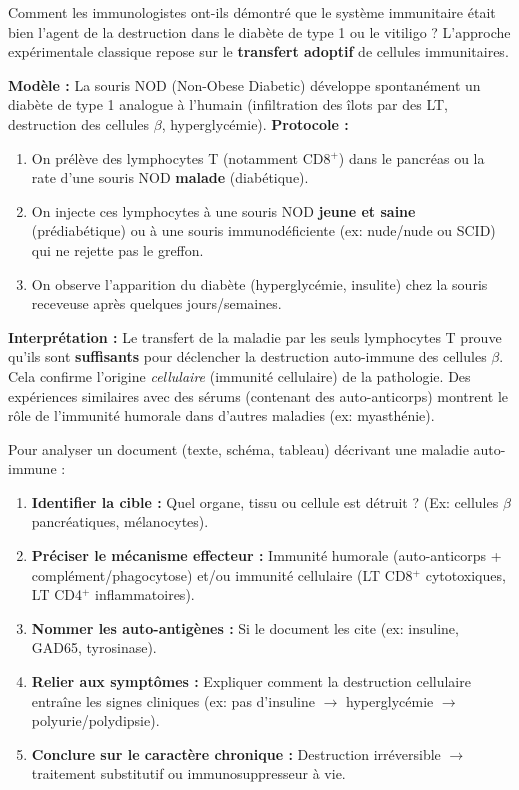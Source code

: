 \documentclass[11pt]{article}
\begin{document}
Comment les immunologistes ont-ils démontré que le système immunitaire était bien l'agent de la destruction dans le diabète de type 1 ou le vitiligo ? L'approche expérimentale classique repose sur le \textbf{transfert adoptif} de cellules immunitaires.

\begin{experience}
\textbf{Modèle :} La souris NOD (Non-Obese Diabetic) développe spontanément un diabète de type 1 analogue à l'humain (infiltration des îlots par des LT, destruction des cellules $\beta$, hyperglycémie).
\textbf{Protocole :}
\begin{enumerate}
    \item On prélève des lymphocytes T (notamment CD8$^+$) dans le pancréas ou la rate d'une souris NOD \textbf{malade} (diabétique).
    \item On injecte ces lymphocytes à une souris NOD \textbf{jeune et saine} (prédiabétique) ou à une souris immunodéficiente (ex: nude/nude ou SCID) qui ne rejette pas le greffon.
    \item On observe l'apparition du diabète (hyperglycémie, insulite) chez la souris receveuse après quelques jours/semaines.
\end{enumerate}
\textbf{Interprétation :} Le transfert de la maladie par les seuls lymphocytes T prouve qu'ils sont \textbf{suffisants} pour déclencher la destruction auto-immune des cellules $\beta$. Cela confirme l'origine \emph{cellulaire} (immunité cellulaire) de la pathologie. Des expériences similaires avec des sérums (contenant des auto-anticorps) montrent le rôle de l'immunité humorale dans d'autres maladies (ex: myasthénie).
\end{experience}

\begin{methode}
Pour analyser un document (texte, schéma, tableau) décrivant une maladie auto-immune :
\begin{enumerate}
    \item \textbf{Identifier la cible :} Quel organe, tissu ou cellule est détruit ? (Ex: cellules $\beta$ pancréatiques, mélanocytes).
    \item \textbf{Préciser le mécanisme effecteur :} Immunité humorale (auto-anticorps + complément/phagocytose) et/ou immunité cellulaire (LT CD8$^+$ cytotoxiques, LT CD4$^+$ inflammatoires).
    \item \textbf{Nommer les auto-antigènes :} Si le document les cite (ex: insuline, GAD65, tyrosinase).
    \item \textbf{Relier aux symptômes :} Expliquer comment la destruction cellulaire entraîne les signes cliniques (ex: pas d'insuline $\rightarrow$ hyperglycémie $\rightarrow$ polyurie/polydipsie).
    \item \textbf{Conclure sur le caractère chronique :} Destruction irréversible $\rightarrow$ traitement substitutif ou immunosuppresseur à vie.
\end{enumerate}
\end{methode}
\end{document}
